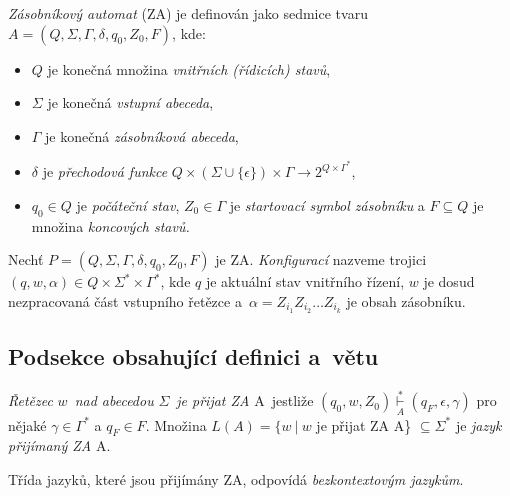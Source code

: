 \documentclass[a4paper, twocolumn, 11pt]{article}
\begin{document}
\label{definicia}
\begin{definice}
\emph{Zásobníkový automat} (ZA) je definován jako sedmice tvaru $A =(Q,\Sigma,\Gamma,\delta,q_0,Z_0,F)$, kde: 
\begin{itemize}
        \item $Q$ je konečná množina \emph{vnitřních (řídicích) stavů}, 
        \item $\Sigma$ je konečná \emph{vstupní abeceda}, 
        \item $\Gamma$ je konečná \emph{zásobníková abeceda}, 
        \item $\delta$ je \emph{přechodová funkce} $Q \times (\Sigma \cup \{\epsilon\}) \times \Gamma \rightarrow 2^{Q \times \Gamma^*}$,
        \item $q_0 \in Q$ je \emph{počáteční stav}, $Z_0 \in \Gamma$ je \emph{startovací symbol zásobníku }a $F \subseteq Q$ je množina \emph{koncových stavů.} 
\end{itemize}
\end{definice}

Nechť $P =(Q,\Sigma,\Gamma,\delta,q_0,Z_0,F)$ je ZA. \emph{Konfigurací} nazveme trojici $(q, w, \alpha) \in Q \times \Sigma^* \times \Gamma^*$, kde $q$ je aktuální stav vnitřního řízení, $w$ je dosud nezpracovaná část vstupního řetězce a~$\alpha = Z_{i_1}Z_{i_2} \dots Z_{i_k}$ je obsah zásobníku.

\subsection{Podsekce obsahující definici a~větu}
\begin{definice}
\emph{Řetězec} $w$~\emph{nad abecedou} $\Sigma$~\emph{je přijat ZA} A~jestliže $(q_0, w, Z_0) \overset{\ast}{\underset{A}{\vdash}} (q_F,\epsilon, \gamma)$ pro nějaké $\gamma \in \Gamma^*$ a $q_F \in F$. Množina $L(A) = \{w\ |\ w $ je přijat ZA A\} $\subseteq \Sigma^*$ je \emph{jazyk přijímaný ZA} A.
\end{definice}
\begin{veta}
Třída jazyků, které jsou přijímány ZA, odpovídá \emph{bezkontextovým jazykům}.
\end{veta}
\end{document}
